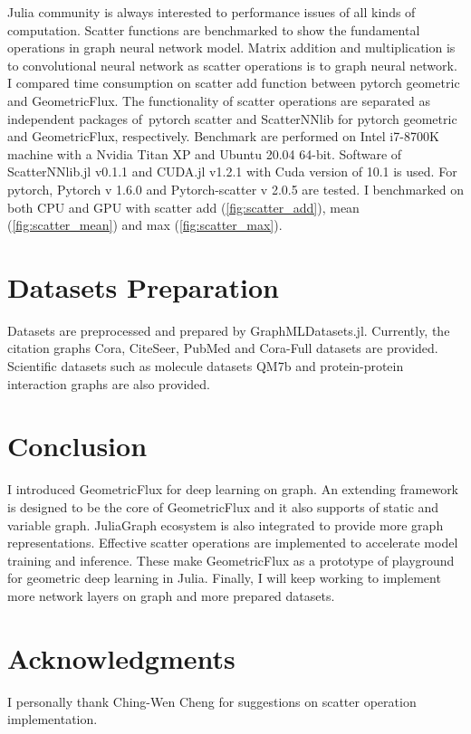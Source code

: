 \documentclass{juliacon}
\begin{document}
Julia community is always interested to performance issues of all kinds of computation.
Scatter functions are benchmarked to show the fundamental operations in graph neural network
model. Matrix addition and multiplication is to convolutional neural network as scatter
operations is to graph neural network. I compared time consumption on scatter add function
between pytorch geometric and GeometricFlux. The functionality of scatter operations are
separated as independent packages of pytorch scatter and ScatterNNlib for pytorch geometric
and GeometricFlux, respectively. Benchmark are performed on Intel i7-8700K machine with a
Nvidia Titan XP and Ubuntu 20.04 64-bit. Software of ScatterNNlib.jl v0.1.1 and CUDA.jl v1.2.1
with Cuda version of 10.1 is used. For pytorch, Pytorch v 1.6.0 and Pytorch-scatter v 2.0.5
are tested. I benchmarked on both CPU and GPU with scatter add (\autoref{fig:scatter_add}), mean (\autoref{fig:scatter_mean})
and max (\autoref{fig:scatter_max}).

\section{Datasets Preparation}

Datasets are preprocessed and prepared by GraphMLDatasets.jl. Currently, the citation graphs
Cora, CiteSeer, PubMed and Cora-Full datasets \cite{sen2008,bojchevski2018deep} are
provided. Scientific datasets such as molecule datasets QM7b \cite{montavon2013} and
protein-protein interaction graphs \cite{hamilton2017} are also provided.

\section{Conclusion}

I introduced GeometricFlux for deep learning on graph. An extending framework is designed
to be the core of GeometricFlux and it also supports of static and variable graph.
JuliaGraph ecosystem is also integrated to provide more graph representations.
Effective scatter operations are implemented to accelerate model training and inference.
These make GeometricFlux as a prototype of playground for geometric deep learning in Julia.
Finally, I will keep working to implement more network layers on graph and more prepared
datasets.

\section{Acknowledgments}

I personally thank Ching-Wen Cheng for suggestions on scatter operation implementation.


\end{document}
